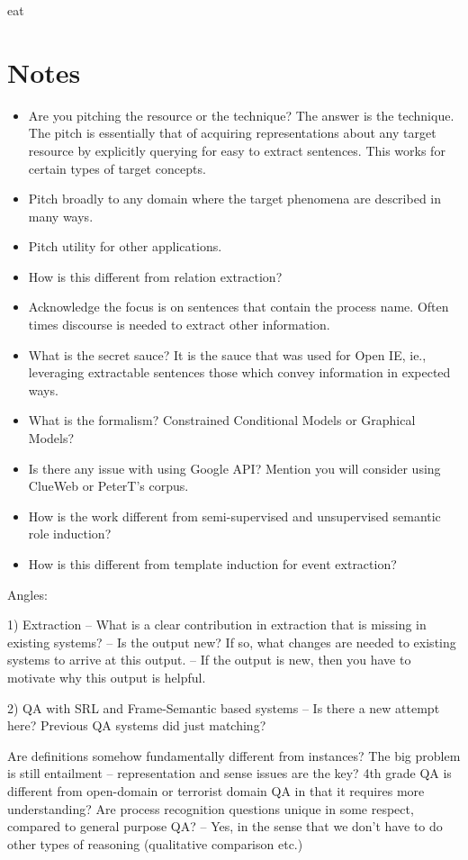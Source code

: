 eat{\section*{Notes}
\begin{itemize}
\item Are you pitching the resource or the technique? The answer is the technique. The pitch is essentially that of acquiring representations about any target resource by explicitly querying for easy to extract sentences. This works for certain types of target concepts.
\item Pitch broadly to any domain where the target phenomena are described in many ways. 
\item Pitch utility for other applications.
\item How is this different from relation extraction?
\item Acknowledge the focus is on sentences that contain the process name. Often times discourse is needed to extract other information.
\item What is the secret sauce? It is the sauce that was used for Open IE, ie., leveraging extractable sentences those which convey information in expected ways.
\item What is the formalism? Constrained Conditional Models or Graphical Models? 
\item Is there any issue with using Google API? Mention you will consider using ClueWeb or PeterT's corpus.
\item How is the work different from semi-supervised and unsupervised semantic role induction?
\item How is this different from template induction for event extraction? 
\end{itemize}
\newpage
}

Angles:

1) Extraction 
	-- What is a clear contribution in extraction that is missing in existing systems?
	-- Is the output new? If so, what changes are needed to existing systems to arrive at this output.
	-- If the output is new, then you have to motivate why this output is helpful. 
	
2) QA with SRL and Frame-Semantic based systems 
	-- Is there a new attempt here? Previous QA systems did just matching? 

Are definitions somehow fundamentally different from instances?
The big problem is still entailment -- representation and sense issues are the key? 
4th grade QA is different from open-domain or terrorist domain QA in that it requires more understanding? 
Are process recognition questions unique in some respect, compared to general purpose QA? 
	-- Yes, in the sense that we don't have to do other types of reasoning (qualitative comparison etc.)


